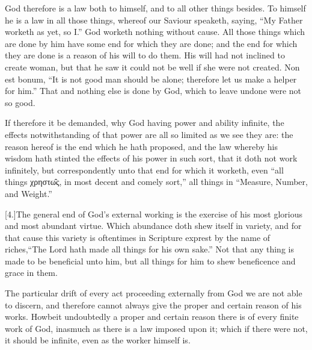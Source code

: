 God therefore is a law both to himself, and to all other things besides. To himself he is a law in all those things, whereof our Saviour speaketh, saying, “My Father worketh as yet, so I.” God worketh nothing without cause. All those things which are done by him have some end for which they are done; and the end for which they are done is a reason of his will to do them. His will had not inclined to create woman, but that he saw it could not be well if she were not created. Non est bonum, “It is not good man should be alone; therefore let us make a helper for him.” That and nothing else is done by God, which to leave undone were not so good.

If therefore it be demanded, why God having power and ability infinite, the effects notwithstanding of that power are all so limited as we see they are: the reason hereof is the end which he hath proposed, and the law whereby his wisdom hath stinted the effects of his power in such sort, that it doth not work infinitely, but correspondently unto that end for which it worketh, even “all things χρηστω̑ς,  in most decent and comely sort,” all things in “Measure, Number, and Weight.”

[4.]The general end of God’s external working is the exercise of his most glorious and most abundant virtue. Which abundance doth shew itself in variety, and for that cause this variety is oftentimes in Scripture exprest by the name of riches,“The Lord hath made all things for his own sake.” Not that any thing is made to be beneficial unto him, but all things for him to shew beneficence and grace in them.

The particular drift of every act proceeding externally from God we are not able to discern, and therefore cannot always give the proper and certain reason of his works. Howbeit undoubtedly a proper and certain reason there is of every finite work of God, inasmuch as there is a law imposed upon it; which if there were not, it should be infinite, even as the worker himself is.

